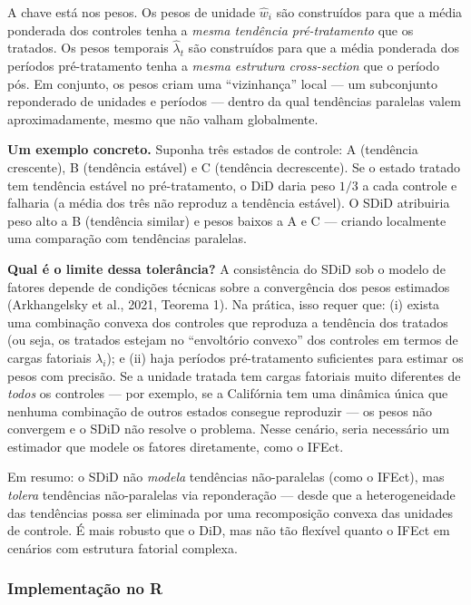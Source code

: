\documentclass[
]{article}
\begin{document}
A chave está nos pesos. Os pesos de unidade \(\hat{w}_i\) são construídos para que a média ponderada dos controles tenha a \emph{mesma tendência pré-tratamento} que os tratados. Os pesos temporais \(\hat{\lambda}_t\) são construídos para que a média ponderada dos períodos pré-tratamento tenha a \emph{mesma estrutura cross-section} que o período pós. Em conjunto, os pesos criam uma ``vizinhança'' local --- um subconjunto reponderado de unidades e períodos --- dentro da qual tendências paralelas valem aproximadamente, mesmo que não valham globalmente.

\textbf{Um exemplo concreto.} Suponha três estados de controle: A (tendência crescente), B (tendência estável) e C (tendência decrescente). Se o estado tratado tem tendência estável no pré-tratamento, o DiD daria peso \(1/3\) a cada controle e falharia (a média dos três não reproduz a tendência estável). O SDiD atribuiria peso alto a B (tendência similar) e pesos baixos a A e C --- criando localmente uma comparação com tendências paralelas.

\textbf{Qual é o limite dessa tolerância?} A consistência do SDiD sob o modelo de fatores depende de condições técnicas sobre a convergência dos pesos estimados (Arkhangelsky et al., 2021, Teorema 1). Na prática, isso requer que: (i) exista uma combinação convexa dos controles que reproduza a tendência dos tratados (ou seja, os tratados estejam no ``envoltório convexo'' dos controles em termos de cargas fatoriais \(\lambda_i\)); e (ii) haja períodos pré-tratamento suficientes para estimar os pesos com precisão. Se a unidade tratada tem cargas fatoriais muito diferentes de \emph{todos} os controles --- por exemplo, se a Califórnia tem uma dinâmica única que nenhuma combinação de outros estados consegue reproduzir --- os pesos não convergem e o SDiD não resolve o problema. Nesse cenário, seria necessário um estimador que modele os fatores diretamente, como o IFEct.

Em resumo: o SDiD não \emph{modela} tendências não-paralelas (como o IFEct), mas \emph{tolera} tendências não-paralelas via reponderação --- desde que a heterogeneidade das tendências possa ser eliminada por uma recomposição convexa das unidades de controle. É mais robusto que o DiD, mas não tão flexível quanto o IFEct em cenários com estrutura fatorial complexa.

\subsubsection{Implementação no R}\label{implementauxe7uxe3o-no-r}
\end{document}
